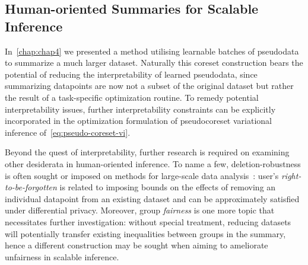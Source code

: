 \subsection{Human-oriented Summaries for Scalable Inference}
\label{subsec:human-oriented-pseudodata}

In~\cref{chap:chap4} we presented a method utilising learnable batches of pseudodata to summarize a much larger dataset. Naturally this coreset construction bears the potential of reducing the interpretability of learned pseudodata, since summarizing datapoints are now not a subset of the original dataset but rather the result of a task-specific optimization routine. To remedy potential interpretability issues, further interpretability constraints can be explicitly incorporated in the optimization formulation of pseudocoreset variational inference of~\cref{eq:pseudo-coreset-vi}.

Beyond the quest of interpretability, further research is required on examining other desiderata in human-oriented inference. To name a few, deletion-robustness is often sought or imposed on methods for large-scale data analysis~\citep{mirzasoleiman17, ginart19}: user's \emph{right-to-be-forgotten} is related to imposing bounds on the effects of removing an individual datapoint from an existing dataset and can be approximately satisfied under differential privacy. Moreover, group \emph{fairness} is one more topic that necessitates further investigation: without special treatment, reducing datasets will potentially transfer existing inequalities between groups in the summary, hence a different construction may be sought when aiming to ameliorate unfairness in scalable inference.  